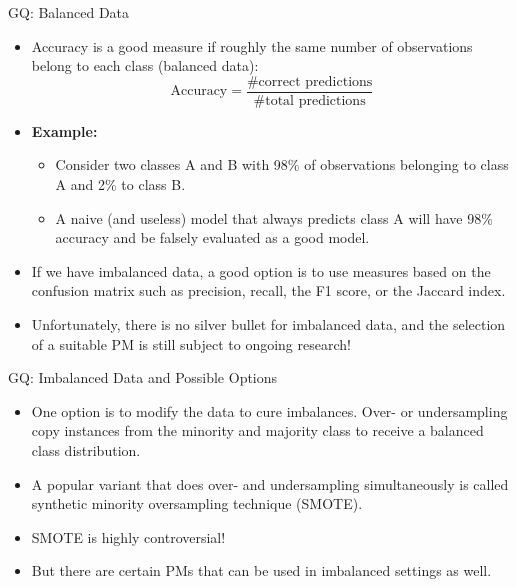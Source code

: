 \documentclass[11pt,compress,t,notes=noshow, aspectratio=169, xcolor=table]{beamer}
\begin{document}
\begin{frame}{GQ: Balanced Data}
    \begin{itemize}
        \setlength\itemsep{1em}
        \item Accuracy is a good measure if roughly the same number of observations belong to each class (balanced data):
            $$
                \text{Accuracy} = \frac{\text{\# correct predictions}}{\text{\# total predictions}}
            $$
        \item \textbf{Example:} 
            \vspace{0.5cm}
        \begin{itemize}
            \itemsep1em
            \item Consider two classes A and B with 98\% of observations belonging to class A and 2\% to class B.
            \item A naive (and useless) model that always predicts class A will have 98\% accuracy and be falsely evaluated as a good model.
        \end{itemize}
        \item If we have imbalanced data, a good option is to use measures based on the confusion matrix such as precision, recall, the F1 score, or the Jaccard index.
        \item Unfortunately, there is no silver bullet for imbalanced data, and the selection of a suitable PM is still subject to ongoing research!
    \end{itemize}
\end{frame}

\begin{frame}{GQ: Imbalanced Data and Possible Options}
    \begin{itemize}
        \setlength\itemsep{1em}
        \item One option is to modify the data to cure imbalances. Over- or undersampling copy instances from the minority and majority class to receive a balanced class distribution.
        \item A popular variant that does over- and undersampling simultaneously is called synthetic minority oversampling technique (SMOTE).
        \item SMOTE is highly controversial!
        \item But there are certain PMs that can be used in imbalanced settings as well.
    \end{itemize}
\end{frame}
\end{document}
